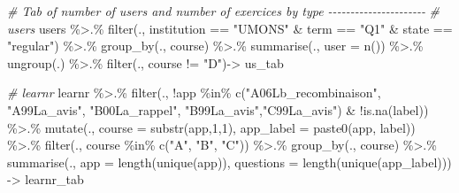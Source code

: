 \documentclass[
]{article}
\newenvironment{Shaded}{\begin{snugshade}}{\end{snugshade}}
\newcommand{\AttributeTok}[1]{\textcolor[rgb]{0.77,0.63,0.00}{#1}}
\newcommand{\CommentTok}[1]{\textcolor[rgb]{0.56,0.35,0.01}{\textit{#1}}}
\newcommand{\DecValTok}[1]{\textcolor[rgb]{0.00,0.00,0.81}{#1}}
\newcommand{\FunctionTok}[1]{\textcolor[rgb]{0.00,0.00,0.00}{#1}}
\newcommand{\NormalTok}[1]{#1}
\newcommand{\OtherTok}[1]{\textcolor[rgb]{0.56,0.35,0.01}{#1}}
\newcommand{\SpecialCharTok}[1]{\textcolor[rgb]{0.00,0.00,0.00}{#1}}
\newcommand{\StringTok}[1]{\textcolor[rgb]{0.31,0.60,0.02}{#1}}
\begin{document}
\begin{Shaded}
\begin{Highlighting}[]
\CommentTok{\# Tab of number of users and number of exercices by type {-}{-}{-}{-}{-}{-}{-}{-}{-}{-}{-}{-}{-}{-}{-}{-}{-}{-}{-}{-}{-}{-}}
\CommentTok{\# users}
\NormalTok{users }\SpecialCharTok{\%\textgreater{}.\%}
  \FunctionTok{filter}\NormalTok{(., institution }\SpecialCharTok{==} \StringTok{"UMONS"} \SpecialCharTok{\&}\NormalTok{ term }\SpecialCharTok{==} \StringTok{"Q1"} \SpecialCharTok{\&}\NormalTok{ state }\SpecialCharTok{==} \StringTok{"regular"}\NormalTok{) }\SpecialCharTok{\%\textgreater{}.\%}
  \FunctionTok{group\_by}\NormalTok{(., course) }\SpecialCharTok{\%\textgreater{}.\%}
  \FunctionTok{summarise}\NormalTok{(., }\AttributeTok{user =} \FunctionTok{n}\NormalTok{()) }\SpecialCharTok{\%\textgreater{}.\%}
  \FunctionTok{ungroup}\NormalTok{(.) }\SpecialCharTok{\%\textgreater{}.\%}
  \FunctionTok{filter}\NormalTok{(., course }\SpecialCharTok{!=} \StringTok{"D"}\NormalTok{)}\OtherTok{{-}\textgreater{}}\NormalTok{ us\_tab}

\CommentTok{\# learnr}
\NormalTok{learnr }\SpecialCharTok{\%\textgreater{}.\%} 
  \FunctionTok{filter}\NormalTok{(., }\SpecialCharTok{!}\NormalTok{app }\SpecialCharTok{\%in\%} \FunctionTok{c}\NormalTok{(}\StringTok{"A06Lb\_recombinaison"}\NormalTok{, }\StringTok{"A99La\_avis"}\NormalTok{, }\StringTok{"B00La\_rappel"}\NormalTok{, }\StringTok{"B99La\_avis"}\NormalTok{,}\StringTok{"C99La\_avis"}\NormalTok{) }\SpecialCharTok{\&} \SpecialCharTok{!}\FunctionTok{is.na}\NormalTok{(label)) }\SpecialCharTok{\%\textgreater{}.\%}
  \FunctionTok{mutate}\NormalTok{(., }\AttributeTok{course =} \FunctionTok{substr}\NormalTok{(app,}\DecValTok{1}\NormalTok{,}\DecValTok{1}\NormalTok{),}
    \AttributeTok{app\_label =} \FunctionTok{paste0}\NormalTok{(app, label)) }\SpecialCharTok{\%\textgreater{}.\%}
  \FunctionTok{filter}\NormalTok{(., course }\SpecialCharTok{\%in\%} \FunctionTok{c}\NormalTok{(}\StringTok{"A"}\NormalTok{, }\StringTok{"B"}\NormalTok{, }\StringTok{"C"}\NormalTok{)) }\SpecialCharTok{\%\textgreater{}.\%}
  \FunctionTok{group\_by}\NormalTok{(., course) }\SpecialCharTok{\%\textgreater{}.\%}
  \FunctionTok{summarise}\NormalTok{(., }\AttributeTok{app =} \FunctionTok{length}\NormalTok{(}\FunctionTok{unique}\NormalTok{(app)), }\AttributeTok{questions =} \FunctionTok{length}\NormalTok{(}\FunctionTok{unique}\NormalTok{(app\_label))) }\OtherTok{{-}\textgreater{}}\NormalTok{ learnr\_tab }


\end{Highlighting}
\end{Shaded}
\end{document}
